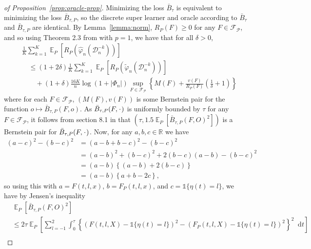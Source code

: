 \documentclass[a4paper,danish]{article}
\DeclareMathOperator{\E}{\mathbb{E}} %
\newcommand{\R}{\mathbb{R}}
\newcommand{\blank}{\makebox[1ex]{\textbf{$\cdot$}}}
\renewcommand{\phi}{\varphi}
\newcommand*\diff{\mathop{}\!\mathrm{d}}
\newcommand{\1}{\mathds{1}}
\newcommand{\data}{\ensuremath{\mathcal{D}}}
\theoremstyle{plain} %
\numberwithin{theorem}{section}
\theoremstyle{definition} %
\theoremstyle{remark}
\begin{document}
\begin{proof}[of Proposition~\ref{prop:oracle-prop}]
  Minimizing the loss \( \bar{B}_{\tau} \) is equivalent to
  minimizing the loss \( \bar{B}_{\tau,P} \), so the discrete super learner and
  oracle according to \( \bar{B}_{\tau} \) and \( \bar{B}_{\tau,P} \) are
  identical. By Lemma~\ref{lemma:norm}, \( R_P(F) \geq 0 \) for any
  \( F \in \mathcal{F}_{\mathcal{P}} \), and so using Theorem 2.3 from
  \citep{vaart2006oracle} with \( p=1 \), we have that for all \( \delta >0 \),
\begin{align*}
  & \frac{1}{K} \sum_{k=1}^{K} \E_{P}{\left[ R_P(\hat{\phi}_n(\data_n^{-k})) \right]}
  \\
  &  \quad \leq
    (1+2\delta)\frac{1}{K} \sum_{k=1}^{K}\E_{P}{\left[ R_P(\tilde{\phi}_n(\data_n^{-k})) \right]}
  \\
  & \qquad + (1+\delta) \frac{16 K}{n}
    \log(1 + |\Phi_n|)\sup_{F \in \mathcal{F}_{\mathcal{P}}}
    \left\{
    M(F) + \frac{v(F)}{R_P(F)}
    \left(
    \frac{1}{\delta} + 1
    \right)
    \right\}
\end{align*}
where for each \( F \in \mathcal{F}_{\mathcal{P}} \),
\( (M(F), v(F)) \) is some Bernstein pair for the function
\(o \mapsto \bar{B}_{\tau,P}(F, o) \). As
\( \bar{B}_{\tau,P}(F, \blank) \) is uniformly bounded by \( \tau \)
for any \( F \in \mathcal{F}_{\mathcal{P}} \), it follows from section
8.1 in \citep{vaart2006oracle} that
\( (\tau, 1.5 \E_P{[\bar{B}_{\tau,P}(F, O)^2]}) \) is a Bernstein
pair for \( \bar{B}_{\tau,P}(F, \blank) \). Now, for any
\( a,b,c \in \R \) we have
\begin{align*}
  (a-c)^2 - (b-c)^2
  & = (a-b+b-c)^2 - (b-c)^2
  \\
  & = (a-b)^2 + (b-c)^2 +2(b-c)(a-b) - (b-c)^2
  \\
  & = (a-b)
    \left\{
    (a-b) +  2(b-c)
    \right\}
  \\
  & = (a-b)
    \left\{
     a + b -2c
    \right\},
\end{align*}
so using this with \( a=F(t, l, x) \), \( b=F_P(t, l, x) \), and
\( c = \1{\{\eta(t) = l\}} \), we have by Jensen's inequality
\begin{align*}
  & \E_P{[\bar{B}_{\tau,P}(F, O)^2]}
  \\
  & \leq
    2\tau\E_{P}{\left[
    \sum_{l=-1}^{2} \int_0^{\tau}
    \left\{
    \left(
    F(t, l, X) - \1{\{\eta(t) = l\}}
    \right)^2
    -
    \left(
    F_P(t, l, X) - \1{\{\eta(t) = l\}}
    \right)^2
    \right\}^2
    \diff t 
    \right]}
  \\

\end{align*}
\end{proof}
\end{document}
